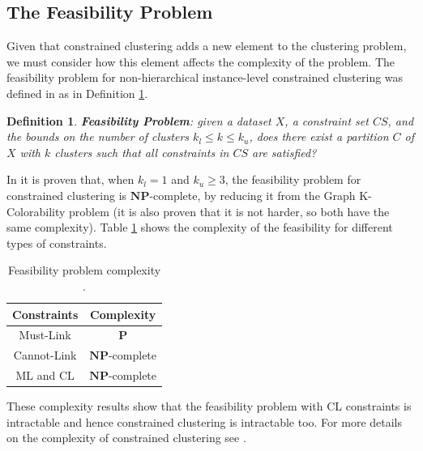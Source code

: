 \documentclass[review]{elsarticle}
\newtheorem{definition}{Definition}
\begin{document}
\subsection{The Feasibility Problem} \label{sec:BackFeas}

Given that constrained clustering adds a new element to the clustering problem, we must consider how this element affects the complexity of the problem. The feasibility problem for non-hierarchical instance-level constrained clustering was defined in \cite{davidson2005clustering} as in Definition \ref{def1}.

\begin{definition}

	\textbf{Feasibility Problem}: given a dataset $X$, a constraint set $CS$, and the bounds on the number of clusters $k_l \leq k \leq k_u$, does there exist a partition $C$ of $X$ with $k$ clusters such that all constraints in $CS$ are satisfied? \cite{davidson2005clustering}
	\label{def1}

\end{definition}

In \cite{davidson2005clustering} it is proven that, when $k_l = 1$ and $k_u \ge 3$, the feasibility problem for constrained clustering is $\mathbf{NP}$-complete, by reducing it from the Graph K-Colorability problem (it is also proven that it is not harder, so both have the same complexity). Table \ref{tab:feasibility} shows the complexity of the feasibility for different types of constraints.

\begin{table}[!h]
	\centering
	\setlength{\tabcolsep}{7pt}
	\renewcommand{\arraystretch}{1.2}
		\begin{tabular}{c c}
			\hline
			Constraints & Complexity \\
			\hline
			Must-Link & $\mathbf{P}$\\
			Cannot-Link & $\mathbf{NP}$-complete\\
			ML and CL & $\mathbf{NP}$-complete\\
			\hline

		\end{tabular}%
	\caption{Feasibility problem complexity \cite{davidson2005clustering}.}
	\label{tab:feasibility}
\end{table}

These complexity results show that the feasibility problem with CL constraints is intractable and hence constrained clustering is intractable too. For more details on the complexity of constrained clustering see \cite{davidson2005clustering}.
\end{document}
